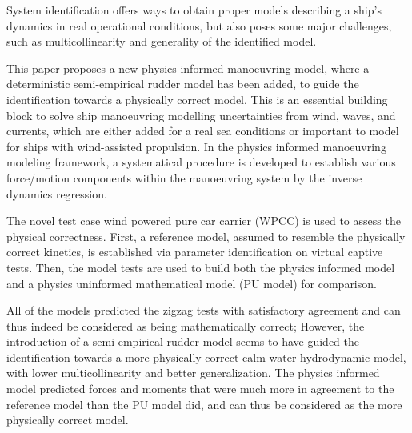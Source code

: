 System identification offers ways to obtain proper models describing a ship's dynamics in real operational conditions, but also poses some major challenges, such as multicollinearity and generality of the identified model. 

This paper proposes a new physics informed manoeuvring model, where a deterministic semi-empirical rudder model has been added, to guide the identification towards a physically correct model.  
This is an essential building block to solve ship manoeuvring modelling uncertainties from wind, waves, and currents, which are either added for a real sea conditions or important to model for ships with wind-assisted propulsion.
In the physics informed manoeuvring modeling framework, a systematical procedure is developed to establish various force/motion components within the manoeuvring system by the inverse dynamics regression. 

The novel test case wind powered pure car carrier (WPCC) is used to assess the physical correctness. First, a reference model, assumed to resemble the physically correct kinetics, is established via parameter identification on virtual captive tests. Then, the model tests are used to build both the physics informed model and a physics uninformed mathematical model (PU model) for comparison.

All of the models predicted the zigzag tests with satisfactory agreement and can thus indeed be considered as being mathematically correct; However, the introduction of a semi-empirical rudder model seems to have guided the identification towards a more physically correct calm water hydrodynamic model, with lower multicollinearity and better generalization. The physics informed model predicted forces and moments that were much more in agreement to the reference model than the PU model did, and can thus be considered as the more physically correct model. 

